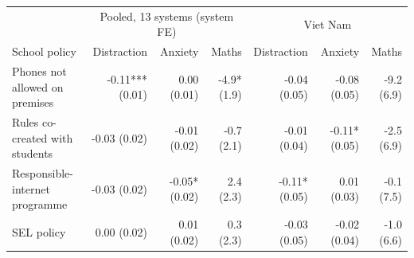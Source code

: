 \begin{tabular}{@{}lrrrrrr@{}}
\toprule
 & \multicolumn{3}{c}{Pooled, 13 systems (system FE)} & \multicolumn{3}{c}{Viet Nam} \\
School policy & Distraction & Anxiety & Maths & Distraction & Anxiety & Maths \\
\midrule
Phones not allowed on premises & -0.11*** (0.01) & 0.00 (0.01) & -4.9* (1.9) & -0.04 (0.05) & -0.08 (0.05) & -9.2 (6.9) \\
Rules co-created with students & -0.03 (0.02) & -0.01 (0.02) & -0.7 (2.1) & -0.01 (0.04) & -0.11* (0.05) & -2.5 (6.9) \\
Responsible-internet programme & -0.03 (0.02) & -0.05* (0.02) & 2.4 (2.3) & -0.11* (0.05) & 0.01 (0.03) & -0.1 (7.5) \\
SEL policy & 0.00 (0.02) & 0.01 (0.02) & 0.3 (2.3) & -0.03 (0.05) & -0.02 (0.04) & -1.0 (6.6) \\
\bottomrule
\end{tabular}
